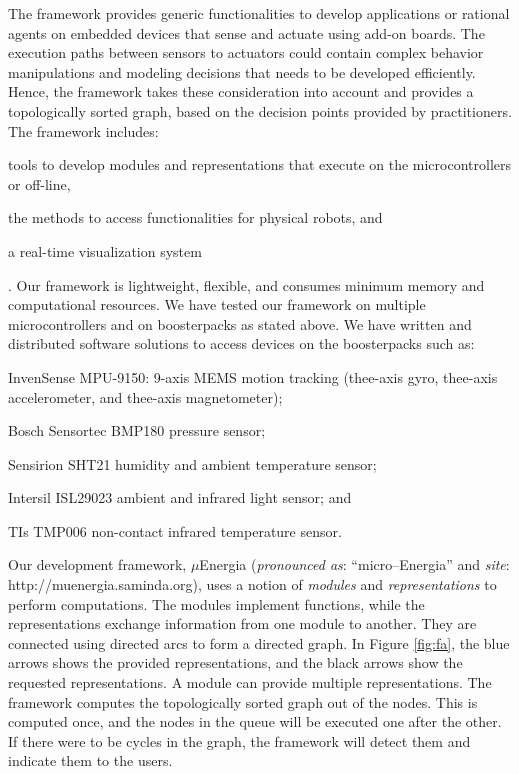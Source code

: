 \documentclass[letterpaper]{article}
\begin{document}
\begin{sloppy}
The framework provides generic functionalities to develop applications or rational agents 
on embedded devices that sense and actuate using add-on boards. The execution paths between sensors 
to actuators could contain complex behavior manipulations and modeling decisions that needs to be 
developed efficiently. Hence, the framework takes these consideration into account and provides a 
topologically sorted graph, based on the decision points provided by practitioners. The framework 
includes: \begin{inparaenum}[1)] \item tools to develop modules and representations that execute on 
the microcontrollers or off-line, \item the methods to access functionalities for physical robots, 
and \item a real-time visualization system\end{inparaenum}. Our framework is lightweight, flexible, 
and consumes minimum memory and computational resources. We have tested our framework on multiple 
microcontrollers and on boosterpacks as stated above. We have written and distributed  software 
solutions to access devices on the boosterpacks such as: \begin{inparaenum}[(1)] \item InvenSense 
MPU-9150: 9-axis MEMS motion tracking (thee-axis gyro, thee-axis accelerometer, and thee-axis 
magnetometer); \item Bosch Sensortec BMP180 pressure sensor; \item Sensirion SHT21 humidity and 
ambient temperature sensor; \item Intersil ISL29023 ambient and infrared light sensor; and \item 
TIs TMP006 non-contact infrared temperature sensor.\end{inparaenum}


Our development framework, $\mu$Energia (\textit{pronounced as}: ``micro--Energia'' and 
\textit{site}:
{http://muenergia.saminda.org}), uses a notion of  {\em modules} and {\em representations} to 
perform computations. The modules implement 
functions, while the representations exchange information from one module to another. They are 
connected using directed arcs to form a directed graph. In Figure \ref{fig:fa}, the blue arrows 
shows the provided representations, and the black arrows show the requested representations. A 
module can provide multiple representations. The framework computes the topologically sorted 
graph out of the nodes. This is computed once, and the nodes in the queue will be executed one 
after the other. If there were to be cycles in the graph, the framework will detect them and 
indicate them to the users. 


\end{sloppy}
\end{document}
